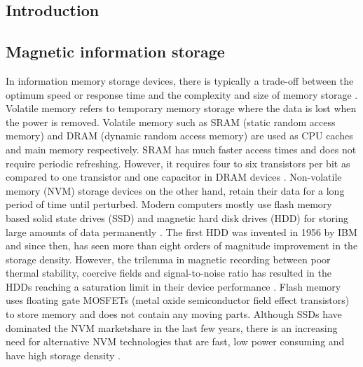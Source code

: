 \documentclass[10pt,doublespacing,edeposit]{uiucthesis2020}
\begin{document}


\begin{mainmatter}

\chapter{Introduction}

\section{Magnetic information storage}

In information memory storage devices, there is typically a trade-off between the optimum speed or response time and the complexity and size of memory storage \cite{Wing1986}. Volatile memory refers to temporary memory storage where the data is lost when the power is removed. Volatile memory such as SRAM (static random access memory) and DRAM (dynamic random access memory) are used as CPU caches and main memory respectively. SRAM has much faster access times and does not require periodic refreshing. However, it requires four to six transistors per bit as compared to one transistor and one capacitor in DRAM devices \cite{Meena2014}. Non-volatile memory (NVM) storage devices on the other hand, retain their data for a long period of time until perturbed. Modern computers mostly use flash memory based solid state drives (SSD) and magnetic hard disk drives (HDD) for storing large amounts of data permanently \cite{Meena2014}. The first HDD was invented in 1956 by IBM and since then, has seen more than eight orders of magnitude improvement in the storage density. However, the trilemma in magnetic recording between poor thermal stability, coercive fields and signal-to-noise ratio has resulted in the HDDs reaching a saturation limit in their device performance \cite{Krishnan2016}. Flash memory uses floating gate MOSFETs (metal oxide semiconductor field effect transistors) to store memory and does not contain any moving parts. Although SSDs have dominated the NVM marketshare in the last few years, there is an increasing need for alternative NVM technologies that are fast, low power consuming and have high storage density \cite{Meena2014}.


\end{mainmatter}
\end{document}
